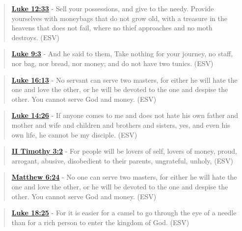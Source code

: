\documentclass[11pt]{article}
\begin{document}
\begin{quote}
\textbf{\href{https://www.biblegateway.com/passage/?search=Luke\%2012\%3A33\&version=ESV}{Luke 12:33}} - Sell your possessions, and give to the needy. Provide yourselves with moneybags that do not grow old, with a treasure in the heavens that does not fail, where no thief approaches and no moth destroys. (ESV)
\end{quote}

\begin{quote}
\textbf{\href{https://www.biblegateway.com/passage/?search=Luke\%209\%3A3\&version=ESV}{Luke 9:3}} - And he said to them, Take nothing for your journey, no staff, nor bag, nor bread, nor money; and do not have two tunics. (ESV)
\end{quote}

\begin{quote}
\textbf{\href{https://www.biblegateway.com/passage/?search=Luke\%2016\%3A13\&version=ESV}{Luke 16:13}} - No servant can serve two masters, for either he will hate the one and love the other, or he will be devoted to the one and despise the other. You cannot serve God and money. (ESV)
\end{quote}

\begin{quote}
\textbf{\href{https://www.biblegateway.com/passage/?search=Luke\%2014\%3A26\&version=ESV}{Luke 14:26}} - If anyone comes to me and does not hate his own father and mother and wife and children and brothers and sisters, yes, and even his own life, he cannot be my disciple. (ESV)
\end{quote}

\begin{quote}
\textbf{\href{https://www.biblegateway.com/passage/?search=2\%20Timothy\%203\%3A2\&version=ESV}{II Timothy 3:2}} - For people will be lovers of self, lovers of money, proud, arrogant, abusive, disobedient to their parents, ungrateful, unholy, (ESV)
\end{quote}

\begin{quote}
\textbf{\href{https://www.biblegateway.com/passage/?search=Matthew\%206\%3A24\&version=ESV}{Matthew 6:24}} - No one can serve two masters, for either he will hate the one and love the other, or he will be devoted to the one and despise the other. You cannot serve God and money. (ESV)
\end{quote}

\begin{quote}
\textbf{\href{https://www.biblegateway.com/passage/?search=Luke\%2018\%3A25\&version=ESV}{Luke 18:25}} - For it is easier for a camel to go through the eye of a needle than for a rich person to enter the kingdom of God. (ESV)
\end{quote}
\end{document}
